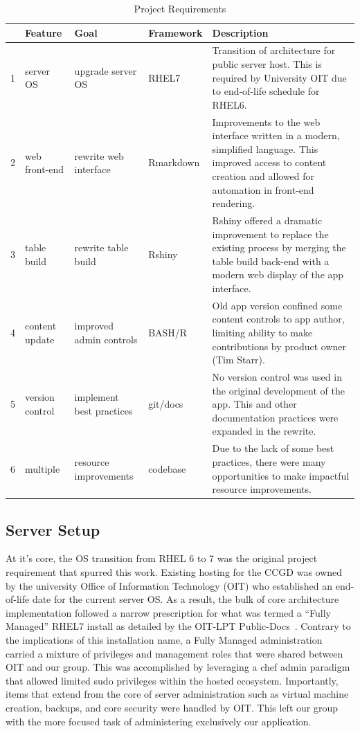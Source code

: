 \documentclass[10pt]{report}
\begin{document}
\begin{table}[H]
    \caption{Project Requirements}\label{table:projectReqs}
    \addtolength\tabcolsep{-0.2em}
    \begin{tabular}{llllp{7cm}}
        \toprule
        &Feature&Goal&Framework&Description\\
        \midrule
        1&server OS&upgrade server OS&RHEL7&Transition of architecture for public server host. This is required by University OIT due to end-of-life schedule for RHEL6.\\
        \midrule
        2&web front-end&rewrite web interface&Rmarkdown&Improvements to the web interface written in a modern, simplified language. This improved access to content creation and allowed for automation in front-end rendering.\\
        \midrule
        3&table build&rewrite table build&Rshiny&Rshiny offered a dramatic improvement to replace the existing process by merging the table build back-end with a modern web display of the app interface.\\
        \midrule
        4&content update&improved admin controls&BASH/R&Old app version confined some content controls to app author, limiting ability to make contributions by product owner (Tim Starr).\\
        \midrule
        5&version control&implement best practices&git/docs&No version control was used in the original development of the app. This and other documentation practices were expanded in the rewrite.\\
        \midrule
        6&multiple&resource improvements&codebase&Due to the lack of some best practices, there were many opportunities to make impactful resource improvements.\\
        \bottomrule
    \end{tabular}
    \addtolength\tabcolsep{+0.2em}
\end{table}

\subsection{Server Setup}
At it's core, the OS transition from RHEL 6 to 7 was the original project requirement that spurred this work. Existing hosting for the CCGD was owned by the university Office of Information Technology (OIT) who established an end-of-life date for the current server OS\@. As a result, the bulk of core architecture implementation followed a narrow prescription for what was termed a ``Fully Managed'' RHEL7 install as detailed by the OIT-LPT Public-Docs~\cite{oitOITLPTPublicDocsThis}. Contrary to the implications of this installation name, a Fully Managed administration carried a mixture of privileges and management roles that were shared between OIT and our group. This was accomplished by leveraging a chef admin paradigm that allowed limited sudo privileges within the hosted ecosystem. Importantly, items that extend from the core of server administration such as virtual machine creation, backups, and core security were handled by OIT\@. This left our group with the more focused task of administering exclusively our application.
\end{document}

